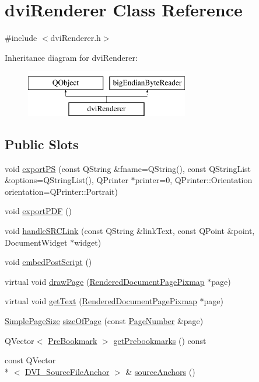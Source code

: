 \hypertarget{classdviRenderer}{\section{dvi\+Renderer Class Reference}
\label{classdviRenderer}
}


{\ttfamily \#include $<$dvi\+Renderer.\+h$>$}

Inheritance diagram for dvi\+Renderer\+:\begin{figure}[H]
\begin{center}
\leavevmode
\includegraphics[height=2.000000cm]{classdviRenderer}
\end{center}
\end{figure}
\subsection*{Public Slots}
\begin{DoxyCompactItemize}
\item 
void \hyperlink{classdviRenderer_a784bc755f1db810e472768128250f917}{export\+P\+S} (const Q\+String \&fname=Q\+String(), const Q\+String\+List \&options=Q\+String\+List(), Q\+Printer $\ast$printer=0, Q\+Printer\+::\+Orientation orientation=Q\+Printer\+::\+Portrait)
\item 
void \hyperlink{classdviRenderer_a433978b1cba35770ed154a0fa3c5ff67}{export\+P\+D\+F} ()
\item 
void \hyperlink{classdviRenderer_aa8da8dcd8e7c35b18004266d3c7b1a4f}{handle\+S\+R\+C\+Link} (const Q\+String \&link\+Text, const Q\+Point \&point, Document\+Widget $\ast$widget)
\item 
void \hyperlink{classdviRenderer_a66c8cc74efb2b2e0c7f6de0c41d1a8a7}{embed\+Post\+Script} ()
\item 
virtual void \hyperlink{classdviRenderer_ac7bf7c2ee0d8e11b9cc465d50953b1c8}{draw\+Page} (\hyperlink{dviPageInfo_8h_abbc025c6680e9098abf69893b8d6de1b}{Rendered\+Document\+Page\+Pixmap} $\ast$page)
\item 
virtual void \hyperlink{classdviRenderer_a8e14acc0c7dffed62d4af08c8bf9226c}{get\+Text} (\hyperlink{dviPageInfo_8h_abbc025c6680e9098abf69893b8d6de1b}{Rendered\+Document\+Page\+Pixmap} $\ast$page)
\item 
\hyperlink{classSimplePageSize}{Simple\+Page\+Size} \hyperlink{classdviRenderer_a8d5430b14cdc4bdf6579402004f31317}{size\+Of\+Page} (const \hyperlink{classPageNumber}{Page\+Number} \&page)
\item 
Q\+Vector$<$ \hyperlink{classPreBookmark}{Pre\+Bookmark} $>$ \hyperlink{classdviRenderer_aa59a29b870ae9a4ec30bfefdde940ca1}{get\+Prebookmarks} () const 
\item 
const Q\+Vector\\*
$<$ \hyperlink{classDVI__SourceFileAnchor}{D\+V\+I\+\_\+\+Source\+File\+Anchor} $>$ \& \hyperlink{classdviRenderer_a0f0daa0b75c84c46bbdb3298979797d9}{source\+Anchors} ()
\end{DoxyCompactItemize}
